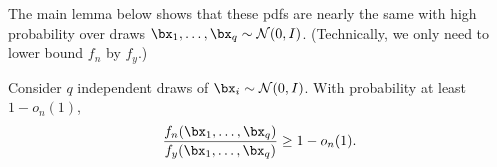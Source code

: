 The main lemma below shows that these pdfs are nearly the same with high probability over draws $\bx_1,\ldots,\bx_q\sim \cN(0,I)$.
(Technically, we only need to lower bound $f_n$ by $f_y$.)

\begin{lemma} \label{lem:gaussian-calc} Consider $q$ independent draws of $\bx_i \sim \cN(0,I)$.
With probability at least $1- o_n(1)$, 
$$\frac{f_n(\bx_1, \ldots, \bx_q)}{f_y(\bx_1, \ldots, \bx_q)} \geq 1-o_n(1) .$$
\end{lemma}

